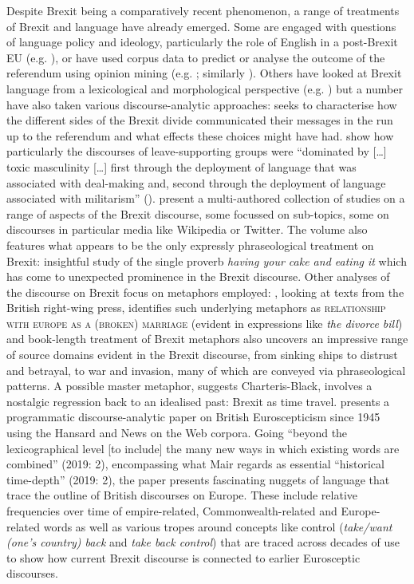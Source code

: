 \documentclass[output=paper]{langscibook}
\begin{document}
Despite Brexit being a comparatively recent phenomenon, a range of treatments of Brexit and language have already emerged. Some are engaged with questions of language policy and ideology, particularly the role of English in a post-Brexit EU (e.g. \citealt{Jacobsen2017,Kelly2018,Modiano2017}), or have used corpus data to predict or analyse the outcome of the referendum using opinion mining (e.g. \citealt{CelliEtAl2016}; similarly \citealt{SimakiEtAl2017}). Others have looked at Brexit language from a lexicological and morphological perspective (e.g. \citealt{Fontaine2017,Lalić-KrstinSilaški2018}) but a number have also taken various discourse-analytic approaches: \citet{Buckledee2018} seeks to characterise how the different sides of the Brexit divide communicated their messages in the run up to the referendum and what effects these choices might have had. \citet{Achilleos-SarllMartill2019} show how particularly the discourses of leave-supporting groups were “dominated by […] toxic masculinity […] first through the deployment of language that was associated with deal-making and, second through the deployment of language associated with militarism” (\citeyear[15]{Achilleos-SarllMartill2019}). \citet{KollerEtAl2019} present a multi-authored collection of studies on a range of aspects of the Brexit discourse, some focussed on sub-topics, some on discourses in particular media like Wikipedia or Twitter. The volume also features what appears to be the only expressly phraseological treatment on Brexit:  insightful study of the single proverb \textit{having your cake and eating it} which has come to unexpected prominence in the Brexit discourse. Other analyses of the discourse on Brexit focus on metaphors employed: \citet{Islentyeva2019}, looking at texts from the British right-wing press, identifies such underlying metaphors as \textsc{relationship with europe as a (broken) marriage} (evident in expressions like \textit{the divorce bill}) and  book-length treatment of Brexit metaphors also uncovers an impressive range of source domains evident in the Brexit discourse, from sinking ships to distrust and betrayal, to war and invasion, many of which are conveyed via phraseological patterns. A possible master metaphor, suggests Charteris-Black, involves a nostalgic regression back to an idealised past: Brexit as time travel. \citet{Mair2019} presents a programmatic discourse-analytic paper on British Euroscepticism since 1945 using the Hansard and News on the Web corpora. Going ``beyond the lexicographical level [to include] the many new ways in which existing words are combined'' (2019: 2), encompassing what Mair regards as essential ``historical time-depth'' (2019: 2), the paper presents fascinating nuggets of language that trace the outline of British discourses on Europe. These include relative frequencies over time of empire-related, Commonwealth-related and Europe-related words as well as various tropes around concepts like control (\textit{take/want (one’s country) back} and \textit{take back control}) that are traced across decades of use to show how current Brexit discourse is connected to earlier Eurosceptic discourses.
\end{document}
